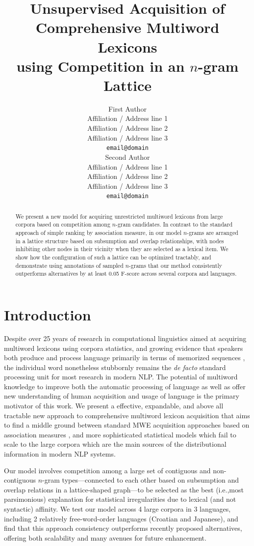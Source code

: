 \documentclass[11pt,letterpaper]{article}
\title{Unsupervised Acquisition of Comprehensive Multiword Lexicons \\ using Competition in an $n$-gram Lattice}
\author{First Author \\
  Affiliation / Address line 1 \\
  Affiliation / Address line 2 \\
  Affiliation / Address line 3 \\
  {\tt email@domain} \\\And
  Second Author \\
  Affiliation / Address line 1 \\
  Affiliation / Address line 2 \\
  Affiliation / Address line 3 \\
  {\tt email@domain} \\}
\date{}
\makeatletter
\def \ie {i.e.,\@ }
\makeatother
\begin{document}
\maketitle


\begin{abstract}
We present a new model for acquiring unrestricted multiword lexicons from large corpora based on  competition among $n$-gram candidates. In contrast to the standard approach of simple ranking by association measure, in our model $n$-grams are arranged in a lattice structure based on subsumption and overlap relationships, with nodes inhibiting other nodes in their vicinity when they are selected as a lexical item. We show how the configuration of such a lattice can be optimized tractably, and demonstrate using annotations of sampled $n$-grams that our method consistently outperforms alternatives by at least 0.05 F-score across several corpora and languages.
\end{abstract}


\section{Introduction}

Despite over 25 years of research in computational linguistics aimed at acquiring multiword lexicons using corpora statistics, and growing evidence that speakers both produce and process language primarily in terms of memorized sequences \cite{Wray08}, the individual word nonetheless stubbornly remains the \textit{de facto} standard processing unit for most research in modern NLP. The potential of multiword knowledge to improve both the automatic processing of language as well as offer new understanding of human acquisition and usage of language is the primary motivator of this work. We present a effective, expandable, and above all tractable new approach to comprehensive multiword lexicon acquisition that aims to find a middle ground between standard MWE acquisition approaches based on association measures \cite{Ramisch14}, and more sophisticated statistical models \cite{Newman12} which fail to scale to the large corpora which are the main sources of the distributional information in modern NLP systems.

Our model involves competition among a large set of contiguous and non-contiguous $n$-gram types---connected to each other based on subsumption and overlap relations in a lattice-shaped graph---to be selected as the best (\ie most parsimonious) explanation for statistical irregularities due to lexical (and not syntactic) affinity. We test our model across 4 large corpora in 3 languages, including 2 relatively free-word-order languages (Croatian and Japanese), and find that this approach consistency outperforms recently proposed alternatives, offering both scalability and many avenues for future enhancement.
\end{document}
